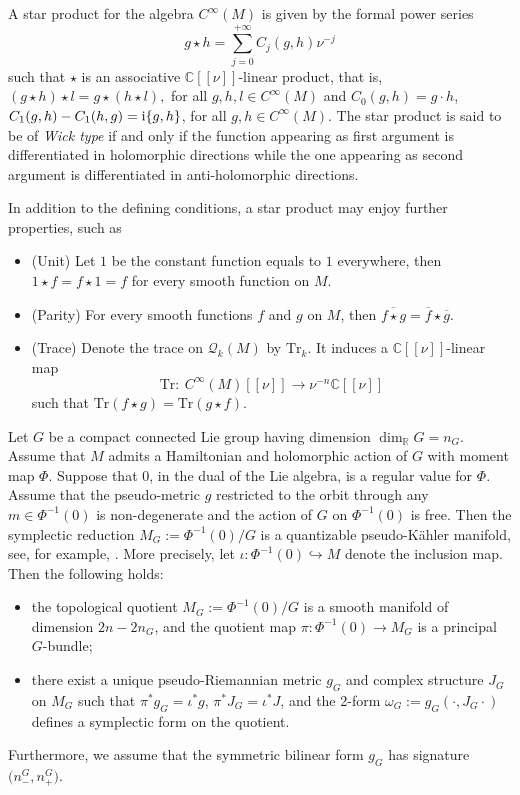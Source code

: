 \documentclass[pdftex]{sigma}
\numberwithin{equation}{section}
\begin{document}
	\begin{Definition} \label{def:star}
		A star product for the algebra $C^{\infty}(M)$ is given by the formal power series
		\[g\star h= \sum_{j=0}^{+\infty} C_{j}(g,h) \nu^{-j} \]
		such that $\star$ is an associative $\mathbb C[[\nu]]$-linear product, that is, $(g\star h) \star l=g\star (h\star l) ,$ for all $g, h, l\in C^{\infty}(M)$ and $C_{0}(g,h)=g\cdot h $, $ C_{1}(g,h)-C_{1}(h,g)= {\rm i} \{g, h\} $, for all $g, h\in C^{\infty}(M)$. The star product is said to be of \textit{Wick type} if and only if the function appearing as first argument is differentiated in holomorphic directions while the one appearing as second argument is differentiated in anti-holomorphic directions.
		
		In addition to the defining conditions, a star product may enjoy further properties, such as
		\begin{itemize}\itemsep=0pt
			\item[(1)] (Unit) Let $1$ be the constant function equals to $1$ everywhere, then $1\star f= f\star 1 =f$ for every smooth function on $M$.
			\item[(2)] (Parity) For every smooth functions $f$ and $g$ on $M$, then $\overline{f\star g}=\overline{f}\star \overline{g}$.
			\item[(3)] (Trace) Denote the trace on $\mathcal{Q}_k(M)$ by $\mathrm{Tr}_k$. It induces a $\mathbb{C}[[\nu]]$-linear map
			\[\mathrm{Tr} \colon\ {C}^{\infty}(M)[[\nu]]\rightarrow \nu^{-n} \mathbb{C}[[\nu]]\]
			such that
			$\mathrm{Tr}(f\star g)=\mathrm{Tr}(g\star f)$.
		\end{itemize}
\end{Definition}
	
Let $G$ be a compact connected Lie group having dimension $\dim_{\mathbb{R}}G=n_G$. Assume that $M$ admits a Hamiltonian and holomorphic action of $G$ with moment map $\Phi$. Suppose that $0$, in the dual of the Lie algebra, is a regular value for $\Phi$. Assume that the pseudo-metric $g$ restricted to the orbit through any $m\in \Phi^{-1}(0)$ is non-degenerate and the action of $G$ on $\Phi^{-1}(0)$ is free. Then the symplectic reduction $M_G:=\Phi^{-1}(0)/G$ is a quantizable pseudo-K\"ahler manifold, see, for example, \cite[Appendix~B]{rungi}. More precisely, let $\iota \colon\Phi^{-1}(0) \hookrightarrow M$ denote the inclusion map. Then the following holds:
	\begin{itemize}\itemsep=0pt
			\item[(1)] the topological quotient $M_G := \Phi^{-1}(0)/G$ is a smooth manifold of dimension $2n - 2n_G$, and the quotient map $\pi \colon \Phi^{-1}(0) \to M_G$ is a principal $G$-bundle;
			\item[(2)] there exist a unique pseudo-Riemannian metric $g_G$ and complex structure $J_G$ on $M_G$ such that
$
			\pi^* g_G = \iota^* g$, $ \pi^* J_G = \iota^* J$,
			and the 2-form $\omega_G := g_G(\cdot, J_G \cdot)$ defines a symplectic form on the quotient.
	\end{itemize}
 Furthermore, we assume that the symmetric bilinear form $g_G$ has signature $\bigl(n_-^G, n_+^G\bigr)$.
\end{document}
